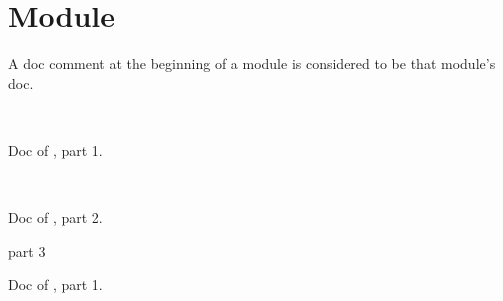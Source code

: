 \section{Module }\label{Toplevel_comments}%
A doc comment at the beginning of a module is considered to be that module's doc.

\label{Toplevel_comments-module-type-T}\begin{ocamlindent}\label{Toplevel_comments-module-type-T-type-t}\\
\end{ocamlindent}%
\begin{ocamlindent}Doc of , part 1.\end{ocamlindent}%
\medbreak
\label{Toplevel_comments-module-Include_inline}\begin{ocamlindent} \hyperref[Toplevel_comments-module-type-T]{}\label{Toplevel_comments-Include_inline-type-t}\\
\end{ocamlindent}%
\begin{ocamlindent}Doc of , part 2.\end{ocamlindent}%
\medbreak
\label{Toplevel_comments-module-Include_inline'}\begin{ocamlindent}part 3 \hyperref[Toplevel_comments-module-type-T]{}\label{Toplevel_comments-Include_inline'-type-t}\\
\end{ocamlindent}%
\begin{ocamlindent}Doc of , part 1.\end{ocamlindent}%
